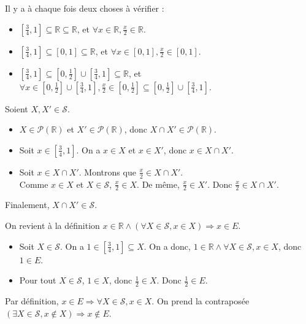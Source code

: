 \begin{corrections}

  \begin{questions}
  \item Il y a à chaque fois deux choses à vérifier :
    \begin{itemize}
    \item $[\frac{3}{4} , 1] \subseteq \mathbb{R} \subseteq \mathbb{R}$, et $\forall x \in \mathbb{R}, \frac{x}{2} \in \mathbb{R}$.
    \item $[\frac{3}{4} , 1] \subseteq [0, 1] \subseteq \mathbb{R}$, et $\forall x \in [0, 1], \frac{x}{2} \in [0, 1]$.
    \item $[\frac{3}{4} , 1] \subseteq [0, \frac{1}{2}] \cup [\frac{3}{4} , 1] \subseteq \mathbb{R}$, et $\forall x \in [0, \frac{1}{2}] \cup [\frac{3}{4} , 1], \frac{x}{2} \in [0, \frac{1}{2}] \subseteq [0, \frac{1}{2}] \cup [\frac{3}{4} , 1]$.
    \end{itemize}
  \item Soient $X, X' \in \mathcal{S}$.
    \begin{itemize}
    \item $X \in \mathscr{P}(\mathbb{R})$ et $X' \in \mathscr{P}(\mathbb{R})$, donc $X \cap X' \in \mathscr{P}(\mathbb{R})$.
    \item Soit $x \in [\frac{3}{4} , 1]$. On a $x\in X$ et $x \in X'$, donc $x \in X\cap X'$.
    \item Soit $x \in X\cap X'$. Montrons que $\frac{x}{2} \in X \cap X'$.\\
      Comme $x \in X$ et $X \in \mathcal{S}$, $\frac{x}{2} \in X$. De même, $\frac{x}{2} \in X'$. Donc $\frac{x}{2} \in X \cap X'$. 
    \end{itemize}
    Finalement, $X \cap X' \in \mathcal{S}$.
  \item On revient à la définition $x \in \mathbb{R} \land (\forall X \in \mathcal{S}, x \in X) \Rightarrow x \in E$. 
    \begin{itemize}
    \item Soit $X \in \mathcal{S}$. On a $1 \in [\frac{3}{4} , 1] \subseteq X$. On a donc, $1 \in \mathbb{R} \land \forall X \in \mathcal{S}, x \in X$, donc $1\in E$. 
    \item Pour tout $X \in \mathcal{S}$, $1 \in X$, donc $\frac{1}{2} \in X$. Donc $\frac{1}{2} \in E$.
    \end{itemize}
  \item Par définition, $x \in E \Rightarrow \forall X \in \mathcal{S}, x \in X$. On prend la contraposée $(\exists X \in \mathcal{S}, x \notin X) \Rightarrow x\notin E$. 

\end{questions}
\end{corrections}
